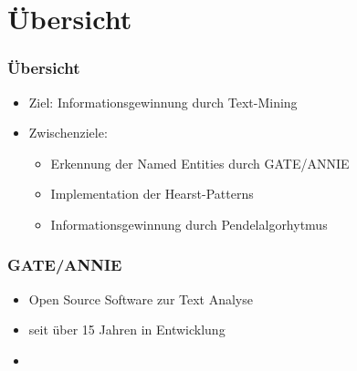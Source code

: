 \section{Übersicht}
\label{sec:uebersicht}

\begin{frame}
  \frametitle{Übersicht}

  \begin{itemize}
  \item Ziel: Informationsgewinnung durch Text-Mining
  \item Zwischenziele:
  \begin{itemize}
    \item \color{green}Erkennung der Named Entities durch GATE/ANNIE
    \item Implementation der Hearst-Patterns
    \item \color{red}Informationsgewinnung durch Pendelalgorhytmus
  \end{itemize}
  \end{itemize}
\end{frame}

\begin{frame}
  \frametitle{GATE/ANNIE}
  \begin{itemize}
    \item Open Source Software zur Text Analyse
    \item seit über 15 Jahren in Entwicklung
    \item 
  \end{itemize}
\end{frame}

